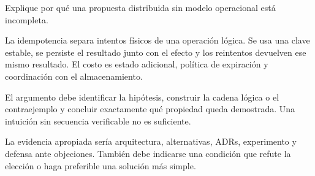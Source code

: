\documentclass[variant=guia,cover=institutional,mode=screen]{ua-engineering-v6-article}
\begin{document}
\begin{uaexercise}
Explique por qué una propuesta distribuida sin modelo operacional está incompleta.
\end{uaexercise}
\begin{uaanswer}
La idempotencia separa intentos físicos de una operación lógica. Se usa una clave estable, se persiste el resultado junto con el efecto y los reintentos devuelven ese mismo resultado. El costo es estado adicional, política de expiración y coordinación con el almacenamiento.

El argumento debe identificar la hipótesis, construir la cadena lógica o el contraejemplo y concluir exactamente qué propiedad queda demostrada. Una intuición sin secuencia verificable no es suficiente.

La evidencia apropiada sería arquitectura, alternativas, ADRs, experimento y defensa ante objeciones. También debe indicarse una condición que refute la elección o haga preferible una solución más simple.
\end{uaanswer}
\end{document}
